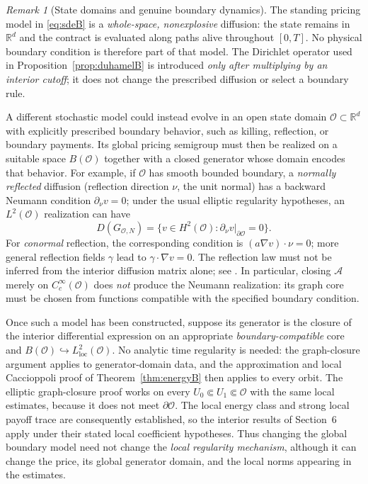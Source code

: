 \documentclass[11pt,a4paper]{article}
\theoremstyle{definition}\newtheorem{definition}{Definition}[section]\newtheorem{example}[theorem]{Example}
\theoremstyle{remark}\newtheorem{remark}[theorem]{Remark}\newtheorem{remarkSix}{Remark}[section]
\newcommand{\Rd}{\mathbb R^d}
\newcommand{\loc}{\mathrm{loc}}
\newcommand{\cA}{\mathcal A}
\begin{document}
\begin{remark}[State domains and genuine boundary dynamics]\label{rem:boundaryB}
The standing pricing model in \eqref{eq:sdeB} is a \emph{whole-space, nonexplosive} diffusion: the state remains in $\Rd$ and the contract is evaluated along paths alive throughout $[0,T]$.  No physical boundary condition is therefore part of that model.  The Dirichlet operator used in Proposition~\ref{prop:duhamelB} is introduced \emph{only after multiplying by an interior cutoff}; it does not change the prescribed diffusion or select a boundary rule.

A different stochastic model could instead evolve in an open state domain $\mathcal O\subset\Rd$ with explicitly prescribed boundary behavior, such as killing, reflection, or boundary payments.  Its global pricing semigroup must then be realized on a suitable space $B(\mathcal O)$ together with a closed generator whose domain encodes that behavior.  For example, if $\mathcal O$ has smooth bounded boundary, a \emph{normally reflected} diffusion (reflection direction $\nu$, the unit normal) has a backward Neumann condition $\partial_\nu v=0$; under the usual elliptic regularity hypotheses, an $L^2(\mathcal O)$ realization can have
\[
D(G_{\mathcal O,N})=\{v\in H^2(\mathcal O):\partial_\nu v|_{\partial\mathcal O}=0\}.
\]
For \emph{conormal} reflection, the corresponding condition is $(a\nabla v)\cdot\nu=0$; more general reflection fields $\gamma$ lead to $\gamma\cdot\nabla v=0$.  The reflection law must not be inferred from the interior diffusion matrix alone; see \cite{lionssznitman}.  In particular, closing $\cA$ merely on $C_c^\infty(\mathcal O)$ does \emph{not} produce the Neumann realization: its graph core must be chosen from functions compatible with the specified boundary condition.

Once such a model has been constructed, suppose its generator is the closure of the interior differential expression on an appropriate \emph{boundary-compatible} core and $B(\mathcal O)\hookrightarrow L^2_{\loc}(\mathcal O)$. No analytic time regularity is needed: the graph-closure argument applies to generator-domain data, and the approximation and local Caccioppoli proof of Theorem~\ref{thm:energyB} then applies to every orbit. The elliptic graph-closure proof works on every $U_0\Subset U_1\Subset\mathcal O$ with the same local estimates, because it does not meet $\partial\mathcal O$.  The local energy class and strong local payoff trace are consequently established, so the interior results of Section~6 apply under their stated local coefficient hypotheses.  Thus changing the global boundary model need not change the \emph{local regularity mechanism}, although it can change the price, its global generator domain, and the local norms appearing in the estimates.
\end{remark}
\end{document}
